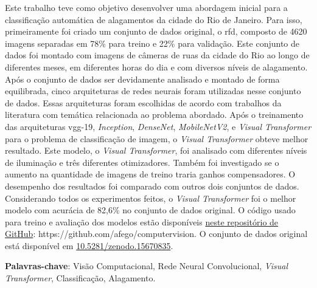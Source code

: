 \begin{resumo}


Este trabalho teve como objetivo desenvolver uma abordagem inicial para a classificação automática de alagamentos da cidade do Rio de Janeiro.
Para isso, primeiramente foi criado um conjunto de dados original, o \acrfull{rfd}, composto de 4620 imagens separadas em 78\% para treino e 22\% para validação.
Este conjunto de dados foi montado com imagens de câmeras de ruas da cidade do Rio ao longo de diferentes meses, em diferentes horas do dia e com diversos níveis de alagamento.
Após o conjunto de dados ser devidamente analisado e montado de forma equilibrada, cinco arquiteturas de redes neurais foram utilizadas nesse conjunto de dados. 
Essas arquiteturas foram escolhidas de acordo com trabalhos da literatura com temática relacionada ao problema abordado.
Após o treinamento das arquiteturas \acrshort{vgg}-19, \textit{Inception}, \textit{DenseNet}, \textit{MobileNetV2}, e \textit{Visual Transformer} para o problema de classificação de imagem, 
o \textit{Visual Transformer} obteve melhor resultado. Este modelo, o \textit{Visual Transformer}, foi analisado com diferentes níveis de iluminação e três diferentes otimizadores.
Também foi investigado se o aumento na quantidade de imagens de treino traria ganhos compensadores. 
O desempenho dos resultados foi comparado com outros dois conjuntos de dados.
Considerando todos os experimentos feitos, o \textit{Visual Transformer} foi o melhor modelo com acurácia de 82,6\% no conjunto de dados original.
O código usado para treino e avaliação dos modelos estão disponíveis \href{https://github.com/afego/computervision}{neste repositório de GitHub}: https://github.com/afego/computervision.
O conjunto de dados original está disponível em \href{https://doi.org/10.5281/zenodo.15670835}{10.5281/zenodo.15670835}.

{\hspace{-8mm} \bf{Palavras-chave}}: Visão Computacional, Rede Neural Convolucional, \textit{Visual Transformer}, Classificação, Alagamento.

\end{resumo}

